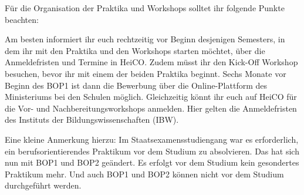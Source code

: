 Für die Organisation der Praktika und Workshops solltet ihr folgende Punkte beachten:

Am besten informiert ihr euch rechtzeitig vor Beginn desjenigen Semesters, in dem ihr mit den Praktika und den Workshops starten möchtet, über die Anmeldefristen und Termine in HeiCO. Zudem müsst ihr den Kick-Off Workshop besuchen, bevor ihr mit einem der beiden Praktika beginnt. Sechs Monate vor Beginn des BOP1 ist dann die Bewerbung über die Online-Plattform des Ministeriums bei den Schulen möglich. Gleichzeitig könnt ihr euch auf HeiCO für die Vor- und Nachbereitungsworkshops anmelden. Hier gelten die Anmeldefristen des  Instituts der Bildungswissenschaften (IBW).

Eine kleine Anmerkung hierzu: Im Staatsexamensstudiengang war es erforderlich, ein berufsorientierendes Praktikum vor dem Studium zu absolvieren. Das hat sich nun mit BOP1 und BOP2 geändert. Es erfolgt vor dem Studium kein gesondertes Praktikum mehr. Und auch BOP1 und BOP2 können nicht vor dem Studium durchgeführt werden.
